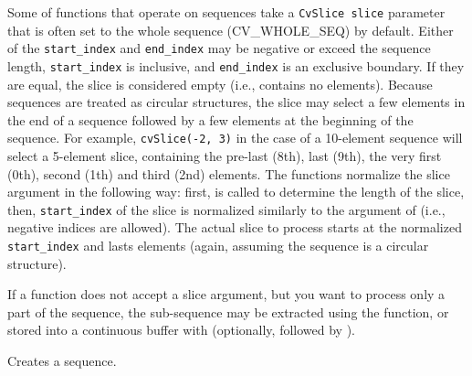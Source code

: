 Some of functions that operate on sequences take a \texttt{CvSlice slice}
parameter that is often set to the whole sequence (CV\_WHOLE\_SEQ) by
default. Either of the \texttt{start\_index} and \texttt{end\_index}
may be negative or exceed the sequence length, \texttt{start\_index} is
inclusive, and \texttt{end\_index} is an exclusive boundary. If they are equal,
the slice is considered empty (i.e., contains no elements). Because
sequences are treated as circular structures, the slice may select a
few elements in the end of a sequence followed by a few elements at the
beginning of the sequence. For example, \texttt{cvSlice(-2, 3)} in the case of
a 10-element sequence will select a 5-element slice, containing the pre-last
(8th), last (9th), the very first (0th), second (1th) and third (2nd)
elements. The functions normalize the slice argument in the following way:
first,  is called to determine the length of the slice,
then, \texttt{start\_index} of the slice is normalized similarly to the
argument of  (i.e., negative indices are allowed). The
actual slice to process starts at the normalized \texttt{start\_index}
and lasts  elements (again, assuming the sequence is
a circular structure).

If a function does not accept a slice argument, but you want to process
only a part of the sequence, the sub-sequence may be extracted
using the  function, or stored into a continuous
buffer with  (optionally, followed by
).

\label{CreateSeq}

Creates a sequence.


\begin{description}
\end{description}

